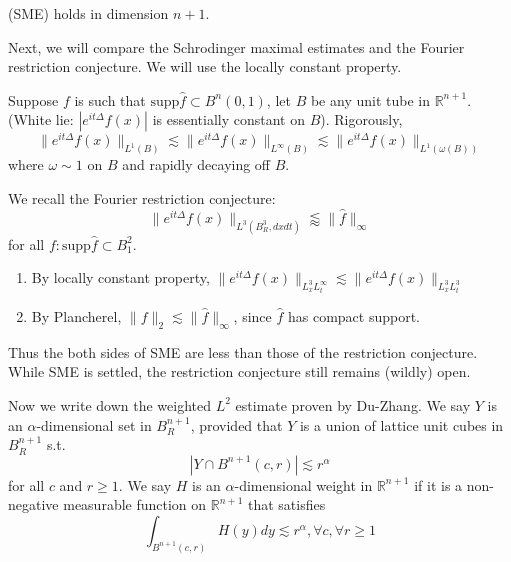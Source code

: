 \documentclass[openany]{book}
\newcommand{\R}{\mathbb{R}}
\begin{document}
\begin{thm}[Du-Zhang, 2019] 
    (SME) holds in dimension $n+1$.
\end{thm}
Next, we will compare the Schrodinger maximal estimates and the Fourier restriction conjecture. We will use the locally constant property. 
\begin{prop}
    Suppose $f$ is such that $\text{supp}\hat{f}\subset B^n(0,1)$, let $B$ be any unit tube in $\R^{n+1}$. (White lie: $|e^{it\Delta}f(x)|$ is essentially constant on $B$). Rigorously, 
    \begin{equation*}
        \|e^{it\Delta}f(x)\|_{L^1(B)}\lesssim\|e^{it\Delta}f(x)\|_{L^\infty(B)}\lesssim\|e^{it\Delta}f(x)\|_{L^1(\omega(B))}
    \end{equation*}
    where $\omega\sim 1$ on $B$ and rapidly decaying off $B$.
\end{prop}
We recall the Fourier restriction conjecture:
\begin{equation*}
    \|e^{it\Delta}f(x)\|_{L^3(B_R^3, dxdt)}\lessapprox \|\hat{f}\|_\infty
\end{equation*}
for all $f: \text{supp}\hat{f}\subset B_1^2$. 
\begin{enumerate}
    \item By locally constant property, $\|e^{it\Delta}f(x)\|_{L_x^3L_t^\infty}\lesssim \|e^{it\Delta}f(x)\|_{L_x^3L_t^3}$
    \item By Plancherel, $\|f\|_2\lesssim\|\hat{f}\|_\infty$, since $\hat{f}$ has compact support.
\end{enumerate}
Thus the both sides of SME are less than those of the restriction conjecture. While SME is settled, the restriction conjecture still remains (wildly) open. 

Now we write down the weighted $L^2$ estimate proven by Du-Zhang. We say $Y$ is an $\alpha$-dimensional set in $B_R^{n+1}$, provided that $Y$ is a union of lattice unit cubes in $B_R^{n+1}$ s.t. 
\begin{equation*}
    |Y\cap B^{n+1}(c,r)|\lesssim r^\alpha
\end{equation*}
for all $c$ and $r\geq 1$. We say $H$ is an $\alpha$-dimensional weight in $\R^{n+1}$ if it is a non-negative measurable function on $\R^{n+1}$ that satisfies 
\begin{equation*}
    \int_{B^{n+1}(c,r)}H(y)dy\lesssim r^\alpha, \forall c, \forall r\geq 1
\end{equation*}
\end{document}
